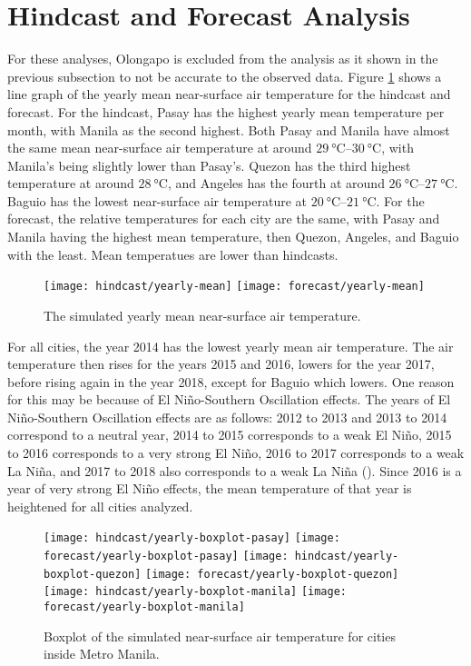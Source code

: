 \section{Hindcast and Forecast Analysis}
	For these analyses, Olongapo is excluded from the analysis as it shown in the previous subsection to not be accurate to the observed data.
	Figure \ref{fig:hindcast-yearly-mean} shows a line graph  of the yearly mean near-surface air temperature for the hindcast and forecast.		
	For the hindcast,
	Pasay has the highest yearly mean temperature per month, with Manila as the second highest.
	Both Pasay and Manila have almost the same mean near-surface air temperature at around $\qtyrange{29}{30}{\degreeCelsius}$, with Manila's being slightly lower than Pasay's.
	Quezon has the third highest temperature at around $\qty{28}{\degreeCelsius}$, 
		and Angeles has the fourth at around $\qtyrange{26}{27}{\degreeCelsius}$.
	Baguio has the lowest near-surface air temperature at $\qtyrange{20}{21}{\degreeCelsius}$.
	For the forecast, the relative temperatures for each city are the same, with Pasay and Manila having the highest mean temperature, then Quezon, Angeles, and Baguio with the least.
	Mean temperatues are lower than hindcasts.
	
	\begin{figure}	
		\centering
		\texttt{[image: hindcast/yearly-mean]}
		\texttt{[image: forecast/yearly-mean]}
		\caption{
			The simulated yearly mean near-surface air temperature.
		}
		\label{fig:hindcast-yearly-mean}
	\end{figure}

	For all cities, the year 2014 has the lowest yearly mean air temperature.
	The air temperature then rises for the years 2015 and 2016,
		lowers for the year 2017,
		before rising again in the year 2018,
			except for Baguio which lowers.
	One reason for this may be because of El Niño-Southern Oscillation effects.
	The years of El Niño-Southern Oscillation effects are as follows:
		2012 to 2013 and 2013 to 2014 correspond to a neutral year,
		2014 to 2015 corresponds to a weak El Niño,
		2015 to 2016 corresponds to a very strong El Niño,
		2016 to 2017 corresponds to a weak La Niña,
		and
		2017 to 2018 also corresponds to a weak La Niña
		(\cite{Null2025}).
	Since 2016 is a year of very strong El Niño effects, the mean temperature of that year is heightened for all cities analyzed.

	\begin{figure}	
		\centering
		\texttt{[image: hindcast/yearly-boxplot-pasay]}
		\texttt{[image: forecast/yearly-boxplot-pasay]}
		\texttt{[image: hindcast/yearly-boxplot-quezon]}
		\texttt{[image: forecast/yearly-boxplot-quezon]}			
		\texttt{[image: hindcast/yearly-boxplot-manila]}
		\texttt{[image: forecast/yearly-boxplot-manila]}			
		\caption{
			Boxplot of the simulated near-surface air temperature for cities inside Metro Manila.
		}
		\label{fig:yearly-boxplot-inside-mm}
	\end{figure}

